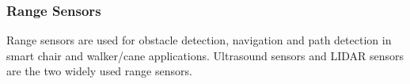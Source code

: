 \subsubsection{Range Sensors}

Range sensors are used for obstacle detection, navigation and path detection in smart chair and walker/cane applications. Ultrasound sensors  \parencite{meshram_astute_2019,wade_feasibility_2019} and LIDAR sensors \parencite{viegas_monitoring_2018} are the two widely used range sensors. 

